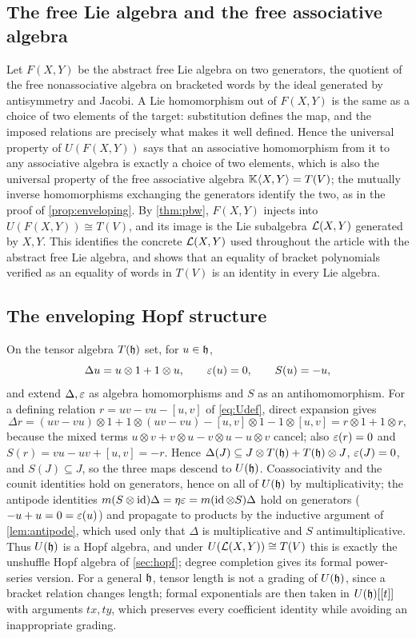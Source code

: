 \subsection{The free Lie algebra and the free associative algebra}
Let $F(X,Y)$ be the abstract free Lie algebra on two generators, the
quotient of the free nonassociative algebra on bracketed words by the
ideal generated by antisymmetry and Jacobi. A Lie homomorphism out of
$F(X,Y)$ is the same as a choice of two elements of the target: substitution
defines the map, and the imposed relations are precisely what makes it well
defined. Hence the universal property of $U(F(X,Y))$ says that an
associative homomorphism from it to any associative algebra is exactly a
choice of two elements, which is also the universal property of the free
associative algebra $\mathbb{K}\langle X,Y\rangle=T(V)$; the mutually inverse
homomorphisms exchanging the generators identify the two, as in the proof
of \cref{prop:enveloping}. By \cref{thm:pbw}, $F(X,Y)$ injects into
$U(F(X,Y))\cong T(V)$, and its image is the Lie subalgebra $\mathcal{L}(X,Y)$
generated by $X,Y$. This identifies the concrete $\mathcal{L}(X,Y)$ used throughout
the article with the abstract free Lie algebra, and shows that an equality
of bracket polynomials verified as an equality of words in $T(V)$ is an
identity in every Lie algebra.

\subsection{The enveloping Hopf structure}
On the tensor algebra $T(\mathfrak{h})$ set, for $u\in\mathfrak{h}$,
\begin{equation}\label{eq:UHopf}
 \Delta u=u\otimes1+1\otimes u,\qquad\varepsilon(u)=0,\qquad S(u)=-u,
\end{equation}
and extend $\Delta,\varepsilon$ as algebra homomorphisms and $S$ as an
antihomomorphism. For a defining relation $r=uv-vu-[u,v]$ of
\eqref{eq:Udef}, direct expansion gives
\[
 \Delta r=(uv-vu)\otimes1+1\otimes(uv-vu)-[u,v]\otimes1-1\otimes[u,v]
 =r\otimes1+1\otimes r,
\]
because the mixed terms $u\otimes v+v\otimes u-v\otimes u-u\otimes v$ cancel;
also $\varepsilon(r)=0$ and $S(r)=vu-uv+[u,v]=-r$. Hence $\Delta(J)\subseteq
J\otimes T(\mathfrak{h})+T(\mathfrak{h})\otimes J$, $\varepsilon(J)=0$, and $S(J)\subseteq J$, so the
three maps descend to $U(\mathfrak{h})$. Coassociativity and the counit identities
hold on generators, hence on all of $U(\mathfrak{h})$ by multiplicativity; the
antipode identities $m(S\otimes\operatorname{id})\Delta=\eta\varepsilon=m(\operatorname{id}\otimes S)\Delta$
hold on generators ($-u+u=0=\varepsilon(u)$) and propagate to products by the
inductive argument of \cref{lem:antipode}, which used only that $\Delta$
is multiplicative and $S$ antimultiplicative. Thus $U(\mathfrak{h})$ is a Hopf
algebra, and under $U(\mathcal{L}(X,Y))\cong T(V)$ this is exactly the unshuffle
Hopf algebra of \cref{sec:hopf}; degree completion gives its formal
power-series version. For a general $\mathfrak{h}$, tensor length is not a grading
of $U(\mathfrak{h})$, since a bracket relation changes length; formal exponentials
are then taken in $U(\mathfrak{h})[[t]]$ with arguments $tx,ty$, which preserves every
coefficient identity while avoiding an inappropriate grading.

